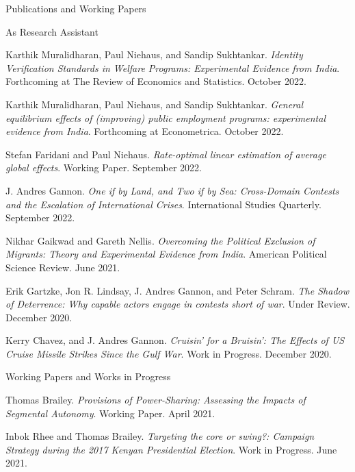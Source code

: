 \documentclass[10pt]{resume} %
\begin{document}
	\begin{rSection}{Publications and Working Papers}\itemsep -5pt
		
		\begin{rSubsection}{As Research Assistant}{}{}{}
		\item Karthik Muralidharan, Paul Niehaus, and Sandip Sukhtankar. \textit{Identity Verification Standards in Welfare Programs: Experimental Evidence from India}. Forthcoming at The Review of Economics and Statistics. October 2022. 
		\item Karthik Muralidharan, Paul Niehaus, and Sandip Sukhtankar. \textit{General equilibrium effects of (improving) public employment programs: experimental evidence from India}. Forthcoming at Econometrica. October 2022. 
		\item Stefan Faridani and Paul Niehaus. \textit{Rate-optimal linear estimation of average global effects}. Working Paper. September 2022.
		\item J. Andres Gannon. \textit{One if by Land, and Two if by Sea: Cross-Domain Contests and the Escalation of International Crises}. International Studies Quarterly. September 2022.
		\item Nikhar Gaikwad and Gareth Nellis. \textit{Overcoming the Political Exclusion of Migrants: Theory and Experimental Evidence from India}. American Political Science Review. June 2021. 
		\item Erik Gartzke, Jon R. Lindsay, J. Andres Gannon, and Peter Schram. \textit{The Shadow of Deterrence: Why capable actors engage in contests short of war}. Under Review. December 2020. 
		\item Kerry Chavez, and J. Andres Gannon. \textit{Cruisin’ for a Bruisin’: The Effects of US Cruise Missile Strikes Since the Gulf War}. Work in Progress. December 2020.
		\end{rSubsection}
	
	\begin{rSubsection}{Working Papers and Works in Progress}{}{}{}
		\item Thomas Brailey. \textit{Provisions of Power-Sharing: Assessing the Impacts of Segmental Autonomy}. Working Paper. April 2021.
		\item Inbok Rhee and Thomas Brailey. \textit{Targeting the core or swing?: Campaign Strategy during the 2017 Kenyan Presidential Election}. Work in Progress. June 2021.
	\end{rSubsection}
	
	\end{rSection}
	
\end{document}
